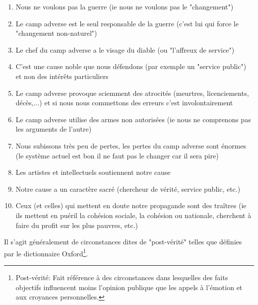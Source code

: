 	\begin{enumerate}
		\item Nous ne voulons pas la guerre (ie nous ne voulons pas le "changement")
		
		\item Le camp adverse est le seul responsable de la guerre (c'est lui qui force le "changement non-naturel")
		
		\item Le chef du camp adverse a le visage du diable (ou "l'affreux de service")
		\item C'est une cause noble que nous d\'efendons (par exemple un "service public") et non des int\'erêts particuliers
		
		\item Le camp adverse provoque sciemment des atrocit\'es (meurtres, licenciements, d\'ecès,...) et si nous nous commettons des erreurs c'est involontairement
		
		\item Le camp adverse  utilise des armes non autoris\'ees (ie nous ne comprenons pas les arguments de l'autre)
		
		\item Nous subissons très peu de pertes, les pertes du camp adverse sont \'enormes (le système actuel est bon il ne faut pas le changer car il sera pire)
		
		\item Les artistes et intellectuels soutiennent notre cause
		
		\item Notre cause a un caractère sacr\'e (chercheur de v\'erit\'e, service public, etc.)
		
		\item Ceux (et celles) qui mettent en doute notre propagande sont des traîtres (ie ils mettent en pu\'eril la coh\'esion sociale, la coh\'esion ou nationale, cherchent à faire du profit sur les plus pauvres, etc.)
	\end{enumerate}
	Il s'agit généralement de circonstances dites de "post-vérité" telles que définies par le dictionnaire Oxford\footnote{Post-vérité: Fait référence à des circonstances dans lesquelles des faits objectifs influencent moins l'opinion publique que les appels à l'émotion et aux croyances personnelles.}.
	
